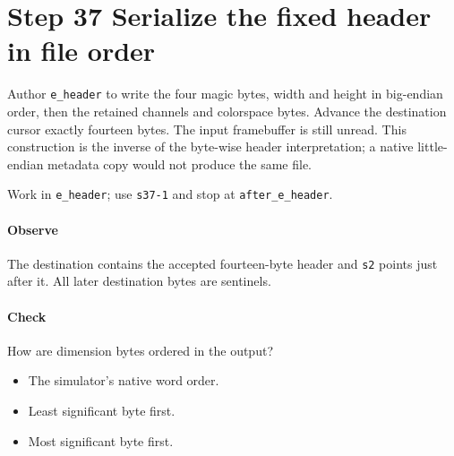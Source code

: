 \section{Step 37 Serialize the fixed header in file order}\label{qoi-s37}
Author \texttt{e\_header} to write the four magic bytes, width and height in big-endian order, then the retained channels and colorspace bytes. Advance the destination cursor exactly fourteen bytes. The input framebuffer is still unread. This construction is the inverse of the byte-wise header interpretation; a native little-endian metadata copy would not produce the same file.

Work in \texttt{e\_header}; use \texttt{s37-1} and stop at \texttt{after\_e\_header}.

\paragraph{Observe} The destination contains the accepted fourteen-byte header and \texttt{s2} points just after it. All later destination bytes are sentinels.

\paragraph{Check} How are dimension bytes ordered in the output?
\begin{itemize}
  \item[A.] The simulator’s native word order.
  \item[B.] Least significant byte first.
  \item[C.] Most significant byte first.
\end{itemize}
